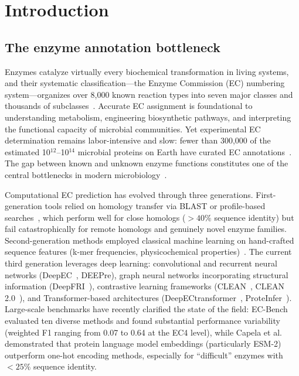 \documentclass[12pt,a4paper]{article}
\begin{document}
\section{Introduction}

\subsection{The enzyme annotation bottleneck}

Enzymes catalyze virtually every biochemical transformation in living systems, and their systematic classification---the Enzyme Commission (EC) numbering system---organizes over 8,000 known reaction types into seven major classes and thousands of subclasses~\cite{kanehisa2023kegg}. Accurate EC assignment is foundational to understanding metabolism, engineering biosynthetic pathways, and interpreting the functional capacity of microbial communities. Yet experimental EC determination remains labor-intensive and slow: fewer than 300,000 of the estimated 10$^{12}$--10$^{14}$ microbial proteins on Earth have curated EC annotations~\cite{locey2016scaling, nayfach2021metagenomic}. The gap between known and unknown enzyme functions constitutes one of the central bottlenecks in modern microbiology~\cite{palsson2026approaches}.

Computational EC prediction has evolved through three generations. First-generation tools relied on homology transfer via BLAST or profile-based searches~\cite{altschul1990basic}, which perform well for close homologs ($>40\%$ sequence identity) but fail catastrophically for remote homologs and genuinely novel enzyme families. Second-generation methods employed classical machine learning on hand-crafted sequence features (k-mer frequencies, physicochemical properties)~\cite{bernal2023deep}. The current third generation leverages deep learning: convolutional and recurrent neural networks (DeepEC~\cite{ryu2019deep}, DEEPre), graph neural networks incorporating structural information (DeepFRI~\cite{gligorijevic2021deepfri}), contrastive learning frameworks (CLEAN~\cite{yu2023clean}, CLEAN 2.0~\cite{elias2025cleaning}), and Transformer-based architectures (DeepECtransformer~\cite{kim2023deepec}, ProteInfer~\cite{detlefsen2024proteInfer}). Large-scale benchmarks have recently clarified the state of the field: EC-Bench~\cite{ecbench2025} evaluated ten diverse methods and found substantial performance variability (weighted F1 ranging from 0.07 to 0.64 at the EC4 level), while Capela et al.~\cite{capela2025comparative} demonstrated that protein language model embeddings (particularly ESM-2) outperform one-hot encoding methods, especially for ``difficult'' enzymes with $<25\%$ sequence identity.
\end{document}

